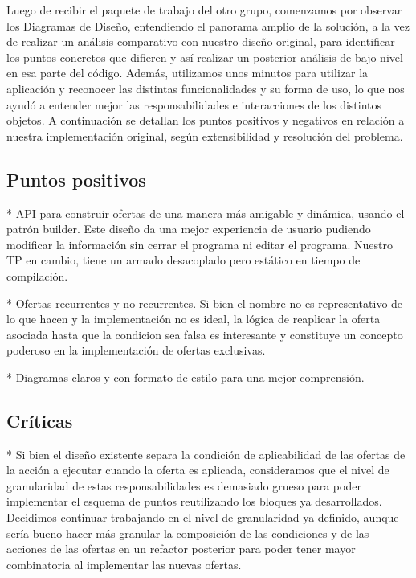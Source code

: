 \documentclass[a4paper,11pt]{article}
\begin{document}
Luego de recibir el paquete de trabajo del otro grupo, comenzamos por observar 
los Diagramas de Diseño, entendiendo el panorama amplio de la solución, a
la vez de realizar un análisis comparativo con nuestro diseño original, 
para identificar los puntos concretos que difieren y así realizar un posterior 
análisis de bajo nivel en esa parte del código.
Además, utilizamos unos minutos para utilizar la aplicación y reconocer las 
distintas funcionalidades y su forma de uso, lo que nos ayudó a entender mejor 
las responsabilidades e interacciones de los distintos objetos.
A continuación se detallan los puntos positivos y negativos en 
relación a nuestra implementación original, según extensibilidad y resolución 
del problema.

\subsection{Puntos positivos}

  * API para construir ofertas de una manera más amigable y dinámica, usando el patrón
  builder. Este diseño da una mejor experiencia de usuario pudiendo modificar la 
  información sin cerrar el programa ni editar el programa. Nuestro TP en cambio, 
  tiene un armado desacoplado pero estático en tiempo de compilación.

  * Ofertas recurrentes y no recurrentes. Si bien el nombre no es
  representativo de lo que hacen y la implementación no es ideal, la lógica
  de reaplicar la oferta asociada hasta que la condicion sea falsa es interesante
  y constituye un concepto poderoso en la implementación de ofertas exclusivas.
  
  * Diagramas claros y con formato de estilo para una mejor comprensión.

\subsection{Críticas}

  * Si bien el diseño existente separa la condición de aplicabilidad de las
  ofertas de la acción a ejecutar cuando la oferta es aplicada,
  consideramos que el nivel de granularidad de estas responsabilidades es demasiado
  grueso para poder implementar el esquema de puntos reutilizando los bloques ya
  desarrollados. Decidimos continuar trabajando en el nivel de granularidad ya
  definido, aunque sería bueno hacer más granular la composición de las
  condiciones y de las acciones de las ofertas en un refactor posterior para
  poder tener mayor combinatoria al implementar las nuevas ofertas.
\end{document}
